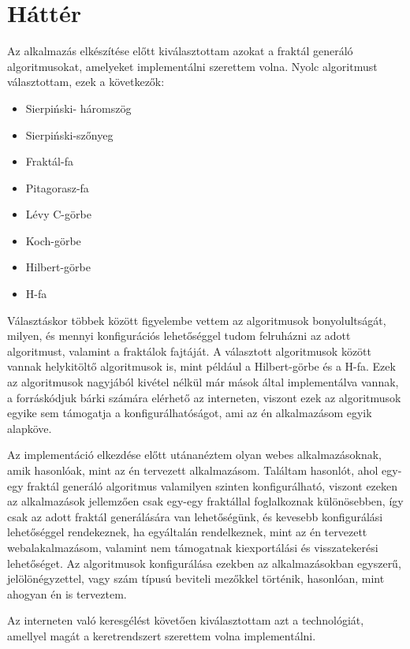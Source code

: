 \chapter*{Háttér}
Az alkalmazás elkészítése előtt kiválasztottam azokat a fraktál generáló algoritmusokat, amelyeket implementálni szerettem volna. Nyolc algoritmust választottam, ezek a következők: 
\begin{itemize}
	\item Sierpiński- háromszög
	\item Sierpiński-szőnyeg
	\item Fraktál-fa
	\item Pitagorasz-fa
	\item Lévy C-görbe
	\item Koch-görbe
	\item Hilbert-görbe
	\item H-fa
\end{itemize}
Választáskor többek között figyelembe vettem az algoritmusok bonyolultságát, milyen, és mennyi konfigurációs lehetőséggel tudom felruházni az adott algoritmust, valamint a fraktálok fajtáját. A választott algoritmusok között vannak helykitöltő algoritmusok is, mint például a Hilbert-görbe és a H-fa. Ezek az algoritmusok nagyjából kivétel nélkül már mások által implementálva vannak, a forráskódjuk bárki számára elérhető az interneten, viszont ezek az algoritmusok egyike sem támogatja a konfigurálhatóságot, ami az én alkalmazásom egyik alapköve. 
\par Az implementáció elkezdése előtt utánanéztem olyan webes alkalmazásoknak, amik hasonlóak, mint az én tervezett alkalmazásom. Találtam hasonlót, ahol egy-egy fraktál generáló algoritmus valamilyen szinten konfigurálható, viszont ezeken az alkalmazások jellemzően csak egy-egy fraktállal foglalkoznak különösebben, így csak az adott fraktál generálására van lehetőségünk, és kevesebb konfigurálási lehetőséggel rendekeznek, ha egyáltalán rendelkeznek, mint az én tervezett webalakalmazásom, valamint nem támogatnak kiexportálási és visszatekerési lehetőséget. Az algoritmusok konfigurálása ezekben az alkalmazásokban egyszerű, jelölönégyzettel, vagy szám típusú beviteli mezőkkel történik, hasonlóan, mint ahogyan én is terveztem. 
\par Az interneten való keresgélést követően kiválasztottam azt a technológiát, amellyel magát a keretrendszert szerettem volna implementálni.
